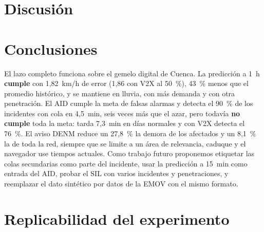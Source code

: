 \documentclass[conference,a4paper]{IEEEtran}
\newcommand{\ok}{\textcolor{ia}{\textbf{cumple}}}
\newcommand{\no}{\textcolor{mal}{\textbf{no cumple}}}
\begin{document}
\section{Discusión}


\section{Conclusiones}
El lazo completo funciona sobre el gemelo digital de Cuenca. La predicción a 1~h \ok{} con 1,82~km/h de error (1,86 con V2X al 50~\%), 43~\% menos que el promedio histórico, y se mantiene en lluvia, con más demanda y con otra penetración. El AID cumple la meta de falsas alarmas y detecta el 90~\% de los incidentes con cola en 4,5~min, seis veces más que el azar, pero todavía \no{} toda la meta: tarda 7,3~min en días normales y con V2X detecta el 76~\%. El aviso DENM reduce un 27,8~\% la demora de los afectados y un 8,1~\% la de toda la red, siempre que se limite a un área de relevancia, caduque y el navegador use tiempos actuales. Como trabajo futuro proponemos etiquetar las colas secundarias como parte del incidente, usar la predicción a 15~min como entrada del AID, probar el SIL con varios incidentes y penetraciones, y reemplazar el dato sintético por datos de la EMOV con el mismo formato.

\section{Replicabilidad del experimento}\label{sec:replica}





\appendices

\end{document}
